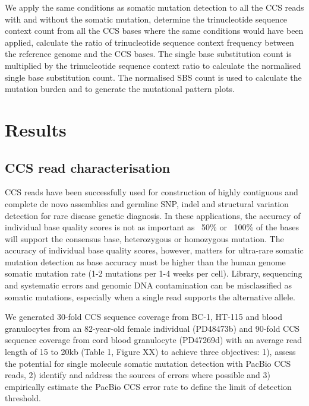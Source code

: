 We apply the same conditions as somatic mutation detection to all the CCS reads with and without the somatic mutation, determine the trinucleotide sequence context count from all the CCS bases where the same conditions would have been applied, calculate the ratio of trinucleotide sequence context frequency between the reference genome and the CCS bases. The single base substitution count is multiplied by the trinucleotide sequence context ratio to calculate the normalised single base substitution count. The normalised SBS count is used to calculate the mutation burden and to generate the mutational pattern plots. 



\section{Results}

\subsection{CCS read characterisation}

CCS reads have been successfully used for construction of highly contiguous and complete de novo assemblies and germline SNP, indel and structural variation detection for rare disease genetic diagnosis. In these applications, the accuracy of individual base quality scores is not as important as ~50\% or ~100\% of the bases will support the consensus base, heterozygous or homozygous mutation. The accuracy of individual base quality scores, however, matters for ultra-rare somatic mutation detection as base accuracy must be higher than the human genome somatic mutation rate (1-2 mutations per 1-4 weeks per cell). Library, sequencing and systematic errors and genomic DNA contamination can be misclassified as somatic mutations, especially when a single read supports the alternative allele. 

We generated 30-fold CCS sequence coverage from BC-1, HT-115 and blood granulocytes from an 82-year-old female individual (PD48473b) and 90-fold CCS sequence coverage from cord blood granulocyte (PD47269d) with an average read length of 15 to 20kb (Table 1, Figure XX) to achieve three objectives: 1), assess the potential for single molecule somatic mutation detection with PacBio CCS reads, 2) identify and address the sources of errors where possible and 3) empirically estimate the PacBio CCS error rate to define the limit of detection threshold. 

